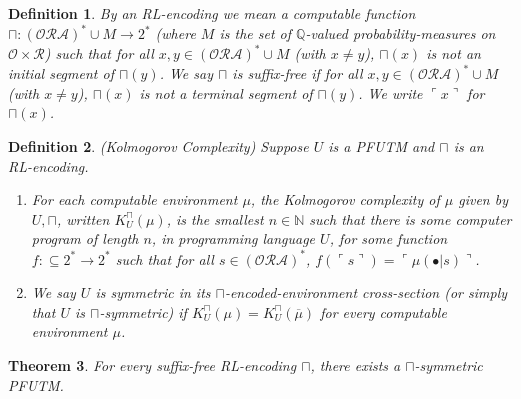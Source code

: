 \documentclass[runningheads]{llncs}
\newtheorem{mytheorem}{Theorem}
\newtheorem{mydefinition}[mytheorem]{Definition}
\begin{document}
\begin{mydefinition}
    By an \emph{RL-encoding} we mean a computable function
    $\sqcap:(\mathcal O\mathcal R\mathcal A)^*\cup M\to 2^*$
    (where $M$ is the set of $\mathbb Q$-valued probability-measures
    on $\mathcal O\times\mathcal R$) such that
    for all $x,y\in (\mathcal O\mathcal R\mathcal A)^*\cup M$ (with $x\not=y$),
    $\sqcap(x)$ is not an initial segment of $\sqcap(y)$.
    We say $\sqcap$ is
    \emph{suffix-free} if
    for all $x,y\in (\mathcal O\mathcal R\mathcal A)^*\cup M$ (with $x\not=y$),
    $\sqcap(x)$ is not a terminal segment of $\sqcap(y)$.
    We write $\ulcorner x\urcorner$ for $\sqcap(x)$.
\end{mydefinition}

\begin{mydefinition}
(Kolmogorov Complexity)
Suppose $U$ is a PFUTM and $\sqcap$ is an RL-encoding.
\begin{enumerate}
    \item
    For each computable environment $\mu$, the \emph{Kolmogorov complexity of $\mu$
    given by $U,\sqcap$}, written $K^\sqcap_U(\mu)$,
    is the smallest $n\in\mathbb N$ such that
    there is some computer program of length $n$, in programming language $U$,
    for some function $f:\subseteq 2^*\to 2^*$ such that
    for all $s\in (\mathcal O\mathcal R\mathcal A)^*$,
    $f(\ulcorner s\urcorner)=\ulcorner \mu(\bullet|s)\urcorner$.
    \item
    We say $U$ is \emph{symmetric in its $\sqcap$-encoded-environment
    cross-section} (or simply that $U$ is \emph{$\sqcap$-symmetric}) if
    $K^\sqcap_U(\mu)=K^\sqcap_U(\overline\mu)$ for every computable environment $\mu$.
\end{enumerate}
\end{mydefinition}

\begin{mytheorem}
\label{envirosymmetricexistencelemma}
    For every suffix-free RL-encoding $\sqcap$,
    there exists a $\sqcap$-symmetric PFUTM.
\end{mytheorem}
\end{document}
